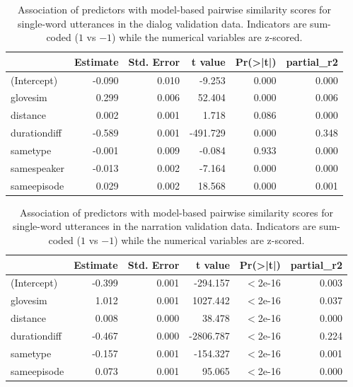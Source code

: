 \begin{table}
  \centering

\begin{tabular}{lrrrrr}
\toprule
  & Estimate & Std. Error & t value & Pr(>|t|) & partial\_r2\\
\midrule
(Intercept) & -0.090 & 0.010 & -9.253 & 0.000 & 0.000\\
glovesim & 0.299 & 0.006 & 52.404 & 0.000 & 0.006\\
distance & 0.002 & 0.001 & 1.718 & 0.086 & 0.000\\
durationdiff & -0.589 & 0.001 & -491.729 & 0.000 & 0.348\\
sametype & -0.001 & 0.009 & -0.084 & 0.933 & 0.000\\
samespeaker & -0.013 & 0.002 & -7.164 & 0.000 & 0.000\\
sameepisode & 0.029 & 0.002 & 18.568 & 0.000 & 0.001\\
  \bottomrule
\end{tabular}
\caption{Association of predictors with model-based pairwise
  similarity scores for single-word utterances in the dialog
  validation data. Indicators are sum-coded ($1$ vs $-1$) while the
  numerical variables are z-scored.}
\label{tab:dialog-lm}
\end{table}



\begin{table}
  \centering
\begin{tabular}{lrrrrr}
\toprule
  & Estimate & Std. Error & t value & Pr(>|t|) & partial\_r2\\
\midrule
(Intercept) & -0.399 & 0.001 & -294.157 & $<$2e-16 & 0.003\\
glovesim & 1.012 & 0.001 & 1027.442 & $<$2e-16 & 0.037\\
distance & 0.008 & 0.000 & 38.478 &  $<$2e-16 & 0.000\\
durationdiff & -0.467 & 0.000 & -2806.787 & $<$2e-16 & 0.224\\
sametype & -0.157 & 0.001 & -154.327 & $<$2e-16 & 0.001\\
sameepisode & 0.073 & 0.001 & 95.065 & $<$2e-16 & 0.000\\
\bottomrule
\end{tabular}
\caption{Association of predictors with model-based pairwise
  similarity scores for single-word utterances in the narration
  validation data. Indicators are sum-coded ($1$ vs $-1$) while the
  numerical variables are z-scored.}
\label{tab:narration-lm}
\end{table}


